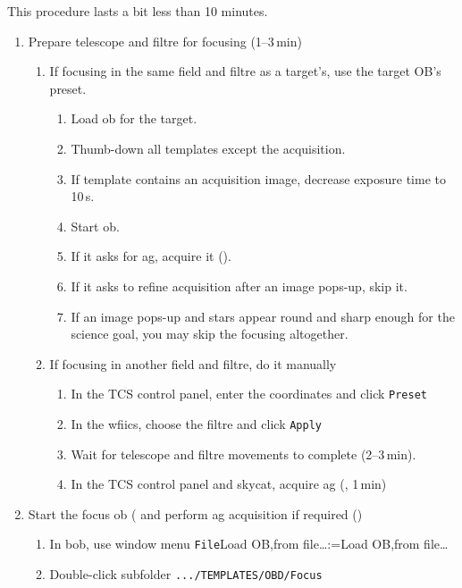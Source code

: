\documentclass[11pt,fleqn,a4paper]{book}
\makeatletter
\def\menu#1#2{\texttt{#1}\ifx{}#2\else\@for\@x:=#2\do{$\rightarrow$\texttt{\@x}}\fi}
\def\wmenu#1#2{window menu \menu{#1}{#2}}
\makeatother
\begin{document}
\label{proc:wfifocseq}
This procedure lasts a bit less than 10 minutes.
\begin{enumerate}
    \item Prepare telescope and filtre for focusing (1--3\,min)
    \begin{enumerate}
        \item If focusing in the same field and filtre as a target's, use the target OB's preset.
        \begin{enumerate}
            \item Load \gls{ob} for the target.
            \item Thumb-down all templates except the \gls{acquisition}.
            \item If template contains an acquisition image, decrease exposure time to 10\,s.
            \item Start ob.
            \item If it asks for \acrlong{ag}, acquire it ().
            \item If it asks to refine acquisition after an image pops-up, skip it.
            \item If an image pops-up and stars appear round and sharp enough for the science goal, you may skip the focusing altogether.
        \end{enumerate}
        \item If focusing in another field and filtre, do it manually
        \begin{enumerate}
            \item In the \gls{TCS control panel}, enter the coordinates and click \texttt{Preset} 
            \item In the \gls{wfiics}, choose the filtre and click \texttt{Apply} 
            \item Wait for telescope and filtre movements to complete (2--3\,min).
            \item In the \gls{TCS control panel} and \gls{skycat}, acquire \acrlong{ag} (, 1\,min)
        \end{enumerate}
    \end{enumerate}
    \item Start the focus \gls{ob} ( and perform \gls{ag} \gls{acquisition} if required ()
    \begin{enumerate}
        \item In bob, use \wmenu{File}{Load OB,from file…}
        \item Double-click subfolder \texttt{.../TEMPLATES/OBD/Focus}

\end{enumerate}
\end{enumerate}
\end{document}
